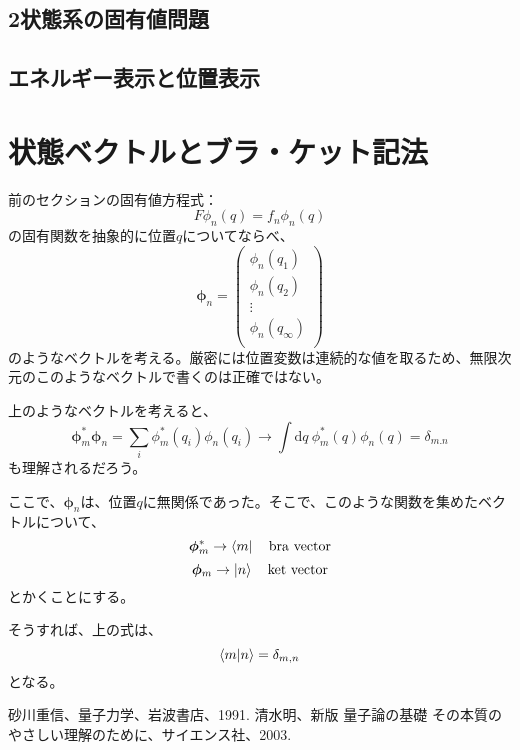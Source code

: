 \documentclass[a4j,10pt,oneside,openany]{jsbook}
\begin{document}
\subsection{2状態系の固有値問題}

\subsection{エネルギー表示と位置表示}

\hrulefill 

\section{状態ベクトルとブラ・ケット記法}
前のセクションの固有値方程式：\[ F\phi_n(q) = f_n \phi_n(q)\]の固有関数を抽象的に位置$q$についてならべ、
\[
	\bm{\phi}_n = 
	\begin{pmatrix}
		\phi_n(q_1) \\
		\phi_n(q_2) \\
		\vdots \\
		\phi_n(q_\infty) \\
	\end{pmatrix}
\]
のようなベクトルを考える。厳密には位置変数は連続的な値を取るため、無限次元のこのようなベクトルで書くのは正確ではない。

上のようなベクトルを考えると、
\[
	\bm{\phi}_m^* \bm{\phi}_n = 
	\sum_i \phi_m^* (q_i) \phi_n (q_i) \rightarrow \int \mathrm{d}q\ \phi_m^*(q) \phi_n(q) = \delta_{m.n}
\]
も理解されるだろう。

ここで、$\bm{\phi}_n$は、位置$q$に無関係であった。そこで、このような関数を集めたベクトルについて、
\[\bm{\phi}_m^* \rightarrow \bra{m} \ \ \ \mathrm{bra\ vector}\]
\[\bm{\phi}_m \rightarrow \ket{n}   \ \ \ \mathrm{ket\ vector}\]
とかくことにする。

そうすれば、上の式は、
\[	\braket{m|n} = \delta_{m,n} \]
となる。
\begin{thebibliography}{20}
  砂川重信、量子力学、岩波書店、1991.
  清水明、新版 量子論の基礎 その本質のやさしい理解のために、サイエンス社、2003.
\end{thebibliography}
\newpage
\printindex
%
%
\end{document}
